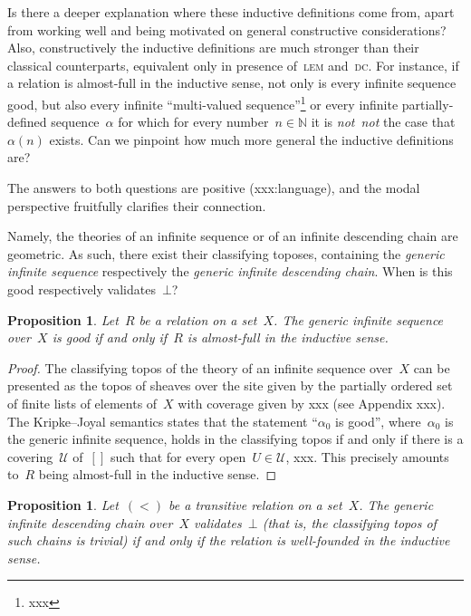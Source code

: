 \documentclass[oneside,reqno]{amsart}
\theoremstyle{definition}
\theoremstyle{plain}
\newtheorem{prop}[defn]{Proposition}
\theoremstyle{remark}
\newcommand{\U}{\mathcal{U}}
\newcommand{\NN}{\mathbb{N}}
\renewcommand{\_}{\mathpunct{.}\,}
\newcommand{\notnot}{\emph{not~not}\xspace}
\newcommand{\?}{\,{:}\,}
\begin{document}
Is there a deeper explanation where these inductive definitions come from,
apart from working well and being motivated on general constructive
considerations? Also, constructively the inductive definitions are much
stronger than their classical counterparts, equivalent only in presence
of~\textsc{lem} and~\textsc{dc}. For instance, if a relation is almost-full in
the inductive sense, not only is every infinite sequence good, but also every
infinite ``multi-valued sequence''\footnote{xxx} or every infinite
partially-defined sequence~$\alpha$ for which for every number~$n \in \NN$ it
is \notnot the case that~$\alpha(n)$ exists. Can we pinpoint how much more
general the inductive definitions are?

The answers to both questions are positive (xxx:language), and the modal
perspective fruitfully clarifies their connection.

Namely, the theories of an infinite sequence or of an infinite descending chain
are geometric. As such, there exist their classifying toposes, containing the
\emph{generic infinite sequence} respectively the \emph{generic infinite
descending chain}. When is this good respectively validates~$\bot$?

\begin{prop}\label{prop:gen-good}Let~$R$ be a relation on a set~$X$. The
generic infinite sequence over~$X$ is good if and only if~$R$ is almost-full in
the inductive sense.\end{prop}

\begin{proof}The classifying topos of the theory of an infinite sequence
over~$X$ can be presented as the topos of sheaves over the site given by the
partially ordered set of finite lists of elements of~$X$ with coverage given
by xxx (see Appendix xxx). The Kripke--Joyal semantics states that the
statement ``$\alpha_0$ is good'', where~$\alpha_0$ is the generic infinite
sequence, holds in the classifying topos if and only if there is a
covering~$\U$ of~$[]$ such that for every open~$U \in \U$, xxx. This precisely
amounts to~$R$ being almost-full in the inductive sense.
\end{proof}

\begin{prop}Let~$({<})$ be a transitive relation on a set~$X$. The generic
infinite descending chain over~$X$ validates~$\bot$ (that is, the classifying
topos of such chains is trivial) if and only if the relation is well-founded in
the inductive sense.\end{prop}
\end{document}
